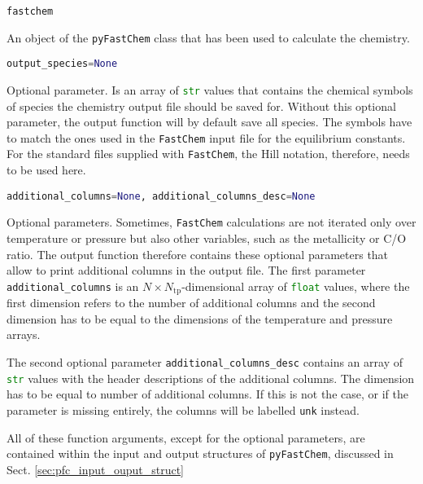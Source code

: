 \documentclass[numbers=noenddot]{aux/fcmanual}
\newcommand{\fc}{\texttt{FastChem}\xspace}
\newcommand{\pfc}{\texttt{pyFastChem}\xspace}
\begin{document}
\bigbreak

\lstinline[language=Python]!fastchem!
\begin{addmargin}[25pt]{0pt}
	An object of the \pfc class that has been used to calculate the chemistry. 
\end{addmargin}


\bigbreak

\lstinline[language=Python]!output_species=None!
\begin{addmargin}[25pt]{0pt}
	Optional parameter. Is an array of \lstinline[language=Python]!str! values that contains the chemical symbols of species the chemistry output file should be saved for. Without this optional parameter, the output function will by default save all species. The symbols have to match the ones used in the \fc input file for the equilibrium constants. For the standard files supplied with \fc, the Hill notation, therefore, needs to be used here.
\end{addmargin}

\bigbreak

\lstinline[language=Python]!additional_columns=None, additional_columns_desc=None!
\begin{addmargin}[25pt]{0pt}
	Optional parameters. Sometimes, \fc calculations are not iterated only over temperature or pressure but also other variables, such as the metallicity or C/O ratio. The output function therefore contains these optional parameters that allow to print additional columns in the output file. The first parameter \lstinline[language=Python]!additional_columns! is an $N\times N_\mathrm{tp}$-dimensional array of \lstinline[language=Python]!float! values, where the first dimension refers to the number of additional columns and the second dimension has to be equal to the dimensions of the temperature and pressure arrays. 
	
	The second optional parameter \lstinline[language=Python]!additional_columns_desc! contains an array of \lstinline[language=Python]!str! values with the header descriptions of the additional columns. The dimension has to be equal to number of additional columns. If this is not the case, or if the parameter is missing entirely, the columns will be labelled \texttt{unk} instead.
\end{addmargin}

\bigbreak

All of these function arguments, except for the optional parameters, are contained within the input and output structures of \pfc, discussed in Sect. \ref{sec:pfc_input_ouput_struct}\\
\end{document}

